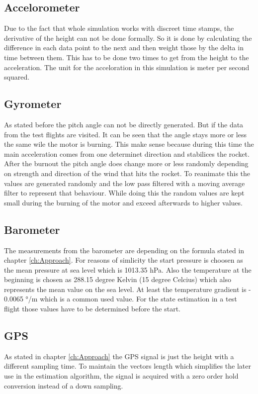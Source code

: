 \subsection{Accelorometer}
Due to the fact that whole simulation works with discreet time stamps, the derivative of the height can not be done formally.
So it is done by calculating the difference in each data point to the next and then weight those by the delta in time between them.
This has to be done two times to get from the height to the acceleration.
The unit for the acceloration in this simulation is meter per second squared.

\subsection{Gyrometer}
As stated before the pitch angle can not be directly generated.
But if the  data from the test flights are visited. It can be seen that the angle stays more or less the same wile the motor is burning.
This make sense because during this time the main acceleration comes from one determinet direction and stabilices the rocket.
After the burnout the pitch angle does change more or less randomly depending on strength and direction of the wind that hits the rocket.
To reanimate this the values are generated randomly and the low pass filtered with a moving average filter to represent that behaviour.
While doing this the random values are kept small during the burning of the motor and exceed afterwards to higher values.

\subsection{Barometer}
The measurements from the barometer are depending on the formula stated in chapter \ref{ch:Approach}.
For reasons of simlicity the start pressure is choosen as the mean pressure at sea level which is 1013.35 hPa.
Also the temperature at the beginning is chosen as 288.15 degree Kelvin (15 degree Celcius) which also represents the mean value on the sea level.
At least the temperature gradient is - 0.0065 °/m which is a common used value.
For the state estimation in a test flight those values have to be determined before the start.

\subsection{GPS}
As stated in chapter \ref{ch:Approach} the GPS signal is just the height with a different sampling time. 
To maintain the vectors length which simplifies the later use in the estimation algorithm,
the signal is acquired with a zero order hold conversion instead of a down sampling. 

